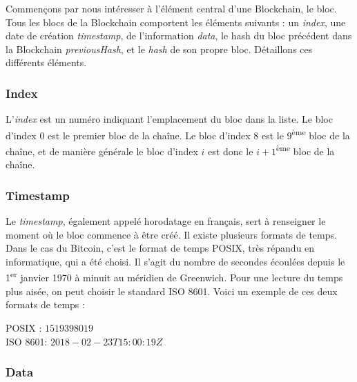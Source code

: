 \documentclass{article}
\begin{document}
Commençons par nous intéresser à l'élément central d'une Blockchain, le bloc. Tous les blocs de la Blockchain comportent les éléments suivants : un \textit{index}, une date de création \textit{timestamp}, de l'information \textit{data}, le hash du bloc précédent dans la Blockchain \textit{previousHash}, et le \textit{hash} de son propre bloc. Détaillons ces différents éléments.

\subsubsection*{Index}

L'\textit{index} est un numéro indiquant l'emplacement du bloc dans la liste. Le bloc d'index 0 est le premier bloc de la chaîne. Le bloc d'index 8 est le 9\textsuperscript{ème} bloc de la chaîne, et de manière générale le bloc d'index $i$ est donc le $i+1$\textsuperscript{ème} bloc de la chaîne.

\subsubsection*{Timestamp}

Le \textit{timestamp}, également appelé horodatage en français, sert à renseigner le moment où le bloc commence à être créé. Il existe plusieurs formats de temps. Dans le cas du Bitcoin, c'est le format de temps POSIX, très répandu en informatique, qui a été choisi. Il s'agit du nombre de secondes écoulées depuis le 1\textsuperscript{er} janvier 1970 à minuit au méridien de Greenwich. Pour une lecture du temps plus aisée, on peut choisir le standard ISO 8601. Voici un exemple de ces deux formats de temps :
\begin{center}
    \vspace{-15pt}
    POSIX : $1519398019$ \\
    ISO 8601: $2018-02-23T15:00:19Z$
\end{center}


\subsubsection*{Data}
\end{document}
